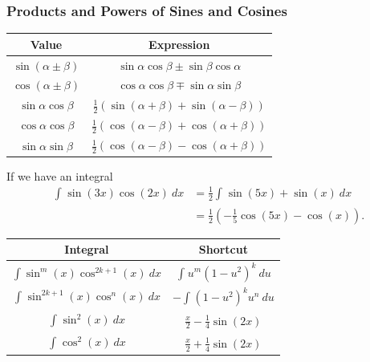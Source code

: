 \documentclass[10pt]{mypackage}
\begin{document}
\subsubsection{Products and Powers of Sines and Cosines}%
\begin{center}
  \renewcommand{\arraystretch}{1.5}
  \begin{tabular}{c|c}
    Value & Expression\\
    \hline
    $\sin\left(\alpha \pm \beta\right)$ & $\sin\alpha\cos\beta \pm \sin\beta\cos\alpha$\\
    $\cos\left(\alpha \pm \beta\right)$ & $\cos\alpha\cos\beta \mp \sin\alpha\sin\beta$\\
    \hline
    $\sin\alpha\cos\beta$ & $\frac{1}{2}\left(\sin(\alpha + \beta) + \sin\left(\alpha - \beta\right)\right)$\\
    $\cos\alpha\cos\beta$ & $\frac{1}{2}\left(\cos(\alpha - \beta) + \cos(\alpha + \beta)\right)$\\
    $\sin\alpha\sin\beta$ & $\frac{1}{2}\left(\cos(\alpha - \beta) - \cos(\alpha + \beta)\right)$
  \end{tabular}
\end{center}
\begin{example}
  If we have an integral
  \begin{align*}
    \int_{}^{} \sin(3x)\cos(2x)\:dx &= \frac{1}{2}\int_{}^{} \sin(5x) + \sin(x)\:dx\\
                                    &= \frac{1}{2}\left(-\frac{1}{5}\cos (5x) - \cos(x) \right).
  \end{align*}
\end{example}
\begin{center}
  \renewcommand{\arraystretch}{1.5}
  \begin{tabular}{c|c}
    Integral & Shortcut\\
    \hline
    $\int \sin^{m}(x)\cos^{2k+1}(x)\:dx$ & $\int_{}^{} u^{m}\left(1-u^2\right)^{k}\:du$\\
    $\int_{}^{} \sin^{2k+1}(x)\cos^{n}(x)\:dx$ & $-\int_{}^{} \left(1-u^2\right)^ku^{n}\:du$\\
    $\int_{}^{} \sin^{2}(x)\:dx$ & $\frac{x}{2} - \frac{1}{4}\sin(2x)$\\
    $\int_{}^{} \cos^{2}\left(x\right)\:dx$ & $\frac{x}{2} + \frac{1}{4}\sin(2x)$
  \end{tabular}
\end{center}
\end{document}
